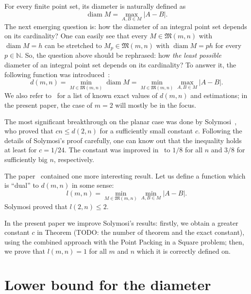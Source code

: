 \documentclass[a4paper,14pt]{article} %
\theoremstyle{plain}
\begin{document}
For every finite point set, its diameter is naturally defined as
\begin{equation}
	\operatorname{diam} M = \max_{A,B\in M} |A-B|
	.
\end{equation}
The next emerging question is: how the diameter of an integral point set depends on its cardinality?
One can easily see that every $M\in\mathfrak{M}(m,n)$ with $\operatorname{diam} M = h$
can be stretched to $M_p\in\mathfrak{M}(m,n)$ with $\operatorname{diam} M = ph$
for every $p\in\mathbb{N}$.
So, the question above should be rephrased:
how \textit{the least possible} diameter of an integral point set depends on its cardinality?
To answer it, the following function was introduced~\cite{kurz2008bounds,kurz2008minimum}:
\begin{equation}
	d(m,n) = \min_{M\in\mathfrak{M}(m,n)} \operatorname{diam} M = \min_{M\in\mathfrak{M}(m,n)} \max_{A,B\in M} |A-B|
	.
\end{equation}
We also refer to~\cite{kurz2008bounds} for a list of known exact values of $d(m,n)$
and estimations; in the present paper, the case of $m=2$ will mostly be in the focus.

The most significant breakthrough on the planar case was done by Solymosi~\cite{solymosi2003note},
who proved that $cn \leq d(2,n)$ for a sufficiently small constant $c$.
Following the details of Solymosi's proof carefully,
one can know out that the inequality holds at least for $c = 1/24$.
The constant was improved in~\cite{our-mz-rus,our-vmmsh-2018}
to $1/8$ for all $n$ and $3/8$ for sufficiently big $n$, respectively.

The paper~\cite{solymosi2003note} contained one more interesting result.
Let us define a function which is ``dual'' to $d(m,n)$ in some sense:
\begin{equation}
	l(m,n) = \min_{M\in\mathfrak{M}(m,n)} \min_{A,B\in M} |A-B|
	.
\end{equation}
Solymosi proved that $l(2,n)\leq 2$.

In the present paper we improve Solymosi's results:
firstly, we obtain a greater constant $c$ in Theorem (TODO: the number of theorem and the exact constant),
using the combined approach with the Point Packing in a Square problem;
then, we prove that $l(m,n)=1$ for all $m$ and $n$ which it is correctly defined on.


\section{Lower bound for the diameter}
\end{document}
